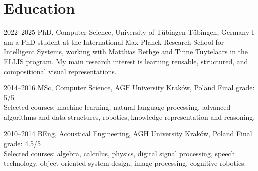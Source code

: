 \documentclass[]{friggeri-cv_osx}
\begin{document}
\section{Education}
\begin{entrylist}

\entry
{2022–2025}
{PhD, Computer Science, University of Tübingen}
{Tübingen, Germany}
{I am a PhD student at the International Max Planck Research School for Intelligent Systems, working with Matthias Bethge and Tinne Tuytelaars in the ELLIS program. My main research interest is learning reusable, structured, and compositional visual representations.\\}

\entry
{2014–2016}
{MSc, Computer Science, AGH University}
{Kraków, Poland}
{Final grade: 5/5\\
Selected courses: machine learning, natural language processing, advanced algorithms and data structures, robotics, knowledge representation and reasoning.\\}

\entry
{2010–2014}
{BEng, Acoustical Engineering, AGH University}
{Kraków, Poland}
{Final grade: 4.5/5\\
Selected courses: algebra, calculus, physics, digital signal processing, speech technology, object-oriented system design, image processing, cognitive robotics.}
\end{entrylist}


\newpage
\end{document}
